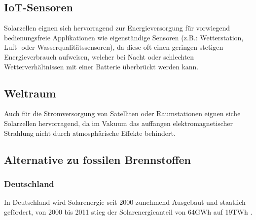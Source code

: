 \subsection{IoT-Sensoren}
    Solarzellen eignen sich hervorragend zur Energieversorgung für
    vorwiegend bedienungsfreie Applikationen wie eigenständige
    Sensoren (z.B.: Wetterstation, Luft- oder Wasserqualitätssensoren),
    da diese oft einen geringen stetigen Energieverbrauch aufweisen,
    welcher bei Nacht oder schlechten Wetterverhältnissen mit einer
    Batterie überbrückt werden kann.

\subsection{Weltraum}
    Auch für die Stromversorgung von Satelliten oder Raumstationen
    eignen siche Solarzellen hervorragend, da im Vakuum das auffangen
    elektromagnetischer Strahlung nicht durch atmosphärische Effekte
    behindert.

\subsection{Alternative zu fossilen Brennstoffen}
    \subsubsection{Deutschland}
        In Deutschland wird Solarenergie seit 2000 zunehmend Ausgebaut
        und staatlich gefördert, von 2000 bis 2011 stieg der
        Solarenergieanteil von 64GWh auf 19TWh
        \cite{Wiki_PhotovoltaicGermany}.

